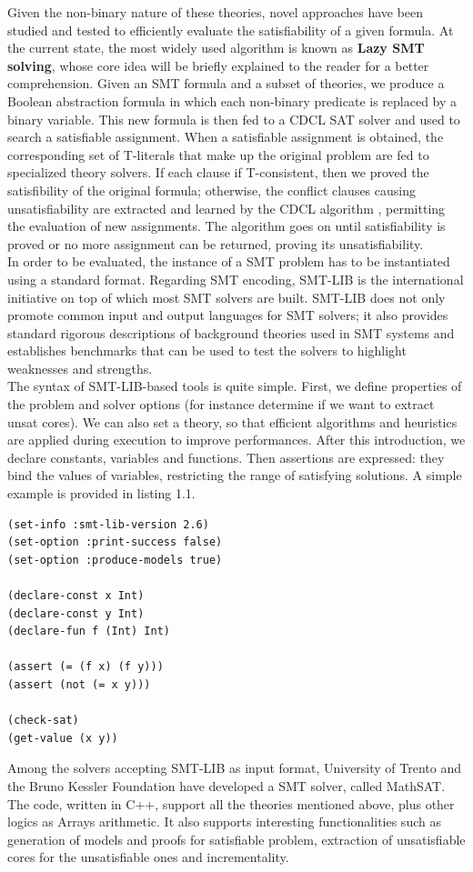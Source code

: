 Given the non-binary nature of these theories, novel approaches have been studied and tested to efficiently evaluate the satisfiability of a given formula. At the current state, the most widely used algorithm is known as \textbf{Lazy SMT solving}\cite{lazysmt}, whose core idea will be briefly explained to the reader for a better comprehension. Given an SMT formula and a subset of theories, we produce a Boolean abstraction formula in which each non-binary predicate is replaced by a binary variable. This new formula is then fed to a CDCL SAT solver and used to search a satisfiable assignment. When a satisfiable assignment is obtained, the corresponding set of T-literals that make up the original problem are fed to specialized theory solvers. If each clause if T-consistent, then we proved the satisfibility of the original formula; otherwise, the conflict clauses causing unsatisfiability are extracted and learned by the CDCL algorithm , permitting the evaluation of new assignments. The algorithm goes on until satisfiability is proved or no more assignment can be returned, proving its unsatisfiability. \\
In order to be evaluated, the instance of a SMT problem has to be instantiated using a standard format. Regarding SMT encoding, SMT-LIB is the international initiative on top of which most SMT solvers are built. SMT-LIB does not only promote common input and output languages for SMT solvers; it also provides standard rigorous descriptions of background theories used in SMT systems and establishes benchmarks that can be used to test the solvers to highlight weaknesses and strengths. \\
The syntax of SMT-LIB-based tools is quite simple. First, we define properties of the problem and solver options (for instance determine if we want to extract unsat cores). We can also set a theory, so that efficient algorithms and heuristics are applied during execution to improve performances. After this introduction, we declare constants, variables and functions. Then assertions are expressed: they bind the values of variables, restricting the range of satisfying solutions. A simple example is provided in listing 1.1. \\
\begin{lstlisting}[style=interfaces,caption=An example of SMT-LIB encoding.]
(set-info :smt-lib-version 2.6)
(set-option :print-success false)
(set-option :produce-models true)

(declare-const x Int)
(declare-const y Int)
(declare-fun f (Int) Int)

(assert (= (f x) (f y)))
(assert (not (= x y)))

(check-sat)
(get-value (x y))
\end{lstlisting}
Among the solvers accepting SMT-LIB as input format, University of Trento and the Bruno Kessler Foundation have developed a SMT solver, called MathSAT. The code, written in C++, support all the theories mentioned above, plus other logics as Arrays arithmetic. It also supports interesting functionalities such as generation of models and proofs for satisfiable problem, extraction of unsatisfiable cores for the unsatisfiable ones and incrementality.

